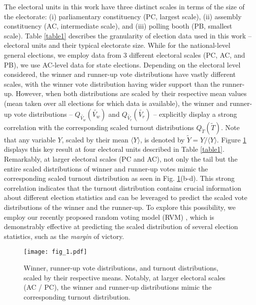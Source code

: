 The electoral units in this work have three distinct scales in terms of the size of the electorate: (i) parliamentary constituency (PC, largest scale), (ii) assembly constituency (AC, intermediate scale), and (iii) polling booth (PB, smallest scale). Table \ref{table1} describes the granularity of election data used in this work -- electoral units and their typical electorate size. While for the national-level general elections, we employ data from 3 different electoral scales (PC, AC, and PB), we use AC-level data for state elections. Depending on the electoral level considered, the winner and runner-up vote distributions have vastly different scales, with the winner vote distribution having wider support than the runner-up. However, when both distributions are scaled by their respective mean values (mean taken over all elections for which data is available), the winner and runner-up vote distributions -- $Q_{\widetilde{V_w}}(\widetilde{V_w})$ and $Q_{\widetilde{V_r}}(\widetilde{V_r})$ -- explicitly display a strong correlation with the corresponding scaled turnout distributions $Q_{\widetilde{T}}(\widetilde{T})$. Note that any variable $Y$, scaled by their mean $\langle Y \rangle$, is denoted by $\widetilde{Y} = Y / \langle Y \rangle$. Figure \ref{fig:1} displays this key result at four electoral units described in Table \ref{table1}. Remarkably, at larger electoral scales (PC and AC), not only the tail but the entire scaled distributions of winner and runner-up votes mimic the corresponding scaled turnout distribution as seen in Fig. \ref{fig:1}(b-d). This strong correlation indicates that the turnout distribution contains crucial information about different election statistics and can be leveraged to predict the scaled vote distributions of the winner and the runner-up. To explore this possibility, we employ our recently proposed random voting model (RVM) \cite{pal2024universal}, which is demonstrably effective at predicting the scaled distribution of several election statistics, such as the \emph{margin} of victory.

\begin{figure}[t]
    \centering
    \texttt{[image: fig\_1.pdf]}
    \caption{Winner, runner-up vote distributions, and turnout distributions, scaled by their respective means. Notably, at larger electoral scales (AC / PC), the winner and runner-up distributions mimic the corresponding turnout distribution.}
    \label{fig:1}
\end{figure}

